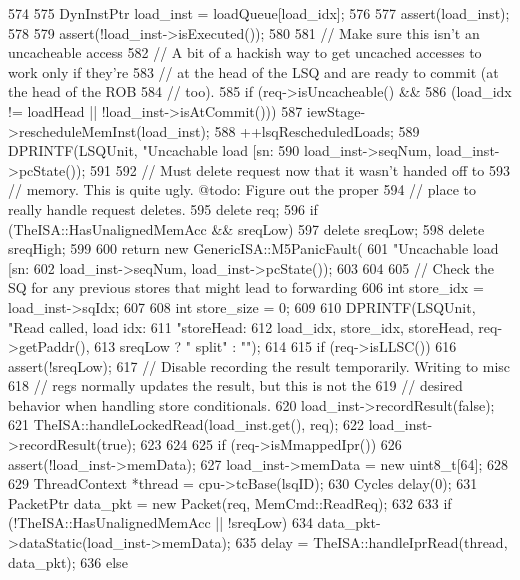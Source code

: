 \begin{DoxyCode}
574 {
575     DynInstPtr load_inst = loadQueue[load_idx];
576 
577     assert(load_inst);
578 
579     assert(!load_inst->isExecuted());
580 
581     // Make sure this isn't an uncacheable access
582     // A bit of a hackish way to get uncached accesses to work only if they're
583     // at the head of the LSQ and are ready to commit (at the head of the ROB
584     // too).
585     if (req->isUncacheable() &&
586         (load_idx != loadHead || !load_inst->isAtCommit())) {
587         iewStage->rescheduleMemInst(load_inst);
588         ++lsqRescheduledLoads;
589         DPRINTF(LSQUnit, "Uncachable load [sn:%
590                 load_inst->seqNum, load_inst->pcState());
591 
592         // Must delete request now that it wasn't handed off to
593         // memory.  This is quite ugly.  @todo: Figure out the proper
594         // place to really handle request deletes.
595         delete req;
596         if (TheISA::HasUnalignedMemAcc && sreqLow) {
597             delete sreqLow;
598             delete sreqHigh;
599         }
600         return new GenericISA::M5PanicFault(
601                 "Uncachable load [sn:%
602                 load_inst->seqNum, load_inst->pcState());
603     }
604 
605     // Check the SQ for any previous stores that might lead to forwarding
606     int store_idx = load_inst->sqIdx;
607 
608     int store_size = 0;
609 
610     DPRINTF(LSQUnit, "Read called, load idx: %
611             "storeHead: %
612             load_idx, store_idx, storeHead, req->getPaddr(),
613             sreqLow ? " split" : "");
614 
615     if (req->isLLSC()) {
616         assert(!sreqLow);
617         // Disable recording the result temporarily.  Writing to misc
618         // regs normally updates the result, but this is not the
619         // desired behavior when handling store conditionals.
620         load_inst->recordResult(false);
621         TheISA::handleLockedRead(load_inst.get(), req);
622         load_inst->recordResult(true);
623     }
624 
625     if (req->isMmappedIpr()) {
626         assert(!load_inst->memData);
627         load_inst->memData = new uint8_t[64];
628 
629         ThreadContext *thread = cpu->tcBase(lsqID);
630         Cycles delay(0);
631         PacketPtr data_pkt = new Packet(req, MemCmd::ReadReq);
632 
633         if (!TheISA::HasUnalignedMemAcc || !sreqLow) {
634             data_pkt->dataStatic(load_inst->memData);
635             delay = TheISA::handleIprRead(thread, data_pkt);
636         } else {
}}}
\end{DoxyCode}
